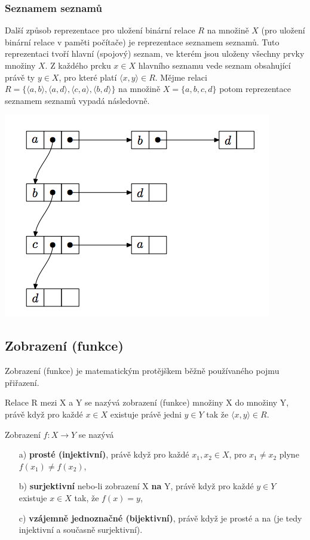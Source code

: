 \subsubsection{Seznamem seznamů}
Další způsob reprezentace pro uložení binární relace $R$ na množině $X$ (pro uložení binární relace v paměti počítače) je reprezentace seznamem seznamů. Tuto reprezentaci tvoří hlavní (spojový) seznam, ve kterém jsou uloženy všechny prvky množiny $X$. Z každého prcku $x \in X$ hlavního seznamu vede seznam obsahující právě ty $y \in X$, pro které platí $\langle x, y \rangle \in R$. Mějme relaci $R = \{\langle a, b\rangle,\langle a, d\rangle,\langle c, a\rangle,\langle b, d\rangle\}$ na množině $X = \{a,b,c,d\}$ potom reprezentace seznamem seznamů vypadá následovně.

\begin{center}
	\includegraphics[scale=0.6]{img/RelationList}
\end{center}

\subsection{Zobrazení (funkce)}
Zobrazení (funkce) je matematickým protějškem běžně používaného pojmu přiřazení.

\begin{definition}
	Relace R mezi X a Y se nazývá zobrazení (funkce) množiny X do množiny Y, právě když pro každé $x \in X$ existuje právě jedni $y \in Y$ tak že $\langle x, y \rangle \in R$.
\end{definition}

\begin{definition}
	Zobrazení $f : X \rightarrow Y$ se nazývá
	\begin{itemize}
		\item[a)] \textbf{prosté (injektivní)}, právě když pro každé $x_1,x_2 \in X$, pro $x_1 \not= x_2$ plyne $f(x_1) \not= f(x_2)$,
		\item[b)] \textbf{surjektivní} nebo-li zobrazení X \textbf{na} Y, právě když pro každé $y \in Y$ existuje $x \in X$ tak, že  $f(x) = y$,
		\item[c)] \textbf{vzájemně jednoznačné (bijektivní)}, právě když je prosté a na (je tedy injektivní a současně surjektivní).
	\end{itemize}
\end{definition}

